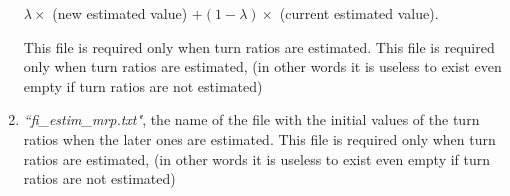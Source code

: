 \begin{enumerate}
$\lambda \times$ (new estimated value) $+ (1- \lambda) \times$ (current estimated value). 

This file is required only when turn ratios are estimated. This file is required only when turn ratios are estimated, (in other words it is useless to exist even empty if turn ratios are not estimated)

\item \emph{``fi\_estim\_mrp.txt"}, the name of the file with the initial values of the turn ratios when the later ones are estimated. This file is required only when turn ratios are estimated, (in other words it is useless to exist even empty if turn ratios are not estimated)

\end{enumerate}

